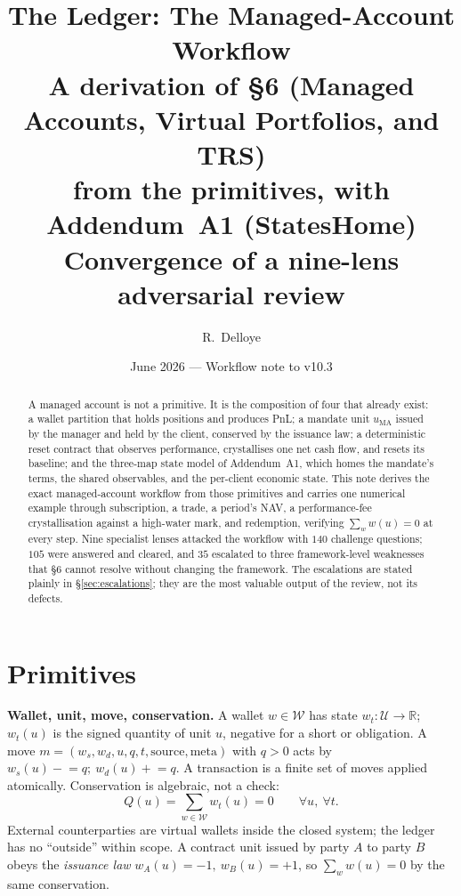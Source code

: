 \documentclass[11pt,a4paper]{article}
\title{The Ledger: The Managed-Account Workflow\\[6pt]
\large A derivation of \S 6 (Managed Accounts, Virtual Portfolios, and TRS)\\
from the primitives, with Addendum~A1 (StatesHome)\\
\normalsize Convergence of a nine-lens adversarial review}
\author{R.\ Delloye}
\date{June 2026 --- Workflow note to v10.3}
\begin{document}
\maketitle

\begin{abstract}
A managed account is not a primitive. It is the composition of four that already exist: a
wallet partition that holds positions and produces PnL; a mandate unit $u_{\mathrm{MA}}$
issued by the manager and held by the client, conserved by the issuance law; a
deterministic reset contract that observes performance, crystallises one net cash flow, and
resets its baseline; and the three-map state model of Addendum~A1, which homes the mandate's
terms, the shared observables, and the per-client economic state. This note derives the exact
managed-account workflow from those primitives and carries one numerical example
through subscription, a trade, a period's NAV, a performance-fee crystallisation against a
high-water mark, and redemption, verifying $\sum_w w(u)=0$ at every step. Nine specialist lenses
attacked the workflow with $140$ challenge questions; $105$ were answered and cleared, and $35$
escalated to three framework-level weaknesses that \S 6 cannot resolve without changing the
framework. The escalations are stated plainly in \S\ref{sec:escalations}; they are the most
valuable output of the review, not its defects.
\end{abstract}

\tableofcontents
\clearpage

\section{Primitives}
\label{sec:primitives}

\noindent\textbf{Wallet, unit, move, conservation.} A wallet $w\in\mathcal{W}$ has state
$w_t:\mathcal{U}\to\mathbb{R}$; $w_t(u)$ is the signed quantity of unit $u$, negative for a
short or obligation. A move $m=(w_s,w_d,u,q,t,\text{source},\text{meta})$ with $q>0$ acts by
$w_s(u)\mathbin{-}\!=q;\ w_d(u)\mathbin{+}\!=q$. A transaction is a finite set of moves applied
atomically. Conservation is algebraic, not a check:
\[
Q(u)=\sum_{w\in\mathcal{W}}w_t(u)=0\qquad\forall u,\ \forall t. \tag{P1}
\]
External counterparties are virtual wallets inside the closed system; the ledger has no
``outside'' within scope. A contract unit issued by party $A$ to party $B$ obeys the
\emph{issuance law} $w_A(u)=-1,\ w_B(u)=+1$, so $\sum_w w(u)=0$ by the same conservation.
\end{document}
